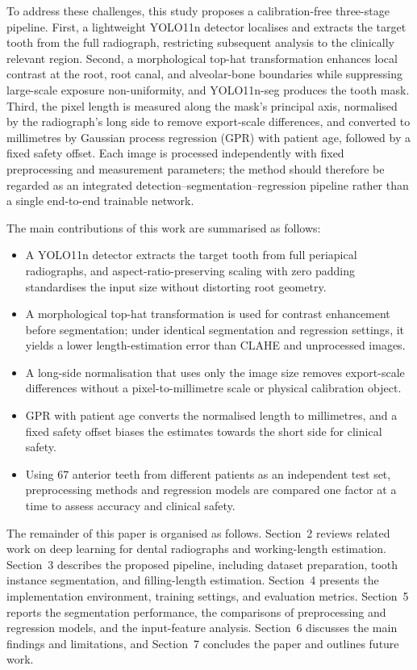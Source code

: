 To address these challenges, this study proposes a calibration-free three-stage pipeline. First, a lightweight YOLO11n detector localises and extracts the target tooth from the full radiograph, restricting subsequent analysis to the clinically relevant region. Second, a morphological top-hat transformation enhances local contrast at the root, root canal, and alveolar-bone boundaries while suppressing large-scale exposure non-uniformity, and YOLO11n-seg produces the tooth mask. Third, the pixel length is measured along the mask's principal axis, normalised by the radiograph's long side to remove export-scale differences, and converted to millimetres by Gaussian process regression (GPR) with patient age, followed by a fixed safety offset. Each image is processed independently with fixed preprocessing and measurement parameters; the method should therefore be regarded as an integrated detection--segmentation--regression pipeline rather than a single end-to-end trainable network.

The main contributions of this work are summarised as follows:
\begin{itemize}
  \item A YOLO11n detector extracts the target tooth from full periapical radiographs, and aspect-ratio-preserving scaling with zero padding standardises the input size without distorting root geometry.
  \item A morphological top-hat transformation is used for contrast enhancement before segmentation; under identical segmentation and regression settings, it yields a lower length-estimation error than CLAHE and unprocessed images.
  \item A long-side normalisation that uses only the image size removes export-scale differences without a pixel-to-millimetre scale or physical calibration object.
  \item GPR with patient age converts the normalised length to millimetres, and a fixed safety offset biases the estimates towards the short side for clinical safety.
  \item Using 67 anterior teeth from different patients as an independent test set, preprocessing methods and regression models are compared one factor at a time to assess accuracy and clinical safety.
\end{itemize}

The remainder of this paper is organised as follows. Section~2 reviews related work on deep learning for dental radiographs and working-length estimation. Section~3 describes the proposed pipeline, including dataset preparation, tooth instance segmentation, and filling-length estimation. Section~4 presents the implementation environment, training settings, and evaluation metrics. Section~5 reports the segmentation performance, the comparisons of preprocessing and regression models, and the input-feature analysis. Section~6 discusses the main findings and limitations, and Section~7 concludes the paper and outlines future work.
